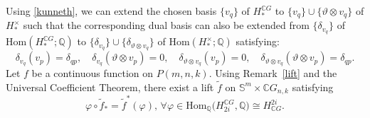\documentclass{amsart}
\newcommand{\remref}[1]{Remark~\ref{#1}}
\renewcommand{\hom}{\mathrm{Hom}}
\begin{document}
	
	Using \eqref{kunneth}, we can extend the chosen basis $\{v_q\}$ of $H_*^{\mathbb{C}G}$ to $	\{v_q\} \cup \{\vartheta \otimes v_q\}$ of $H_*^\times$ such that the corresponding dual basis can also be extended from $\{\delta_{v_q}\}$ of $ \hom (H_*^{\mathbb{C}G};\mathbb{Q})$ to $\{\delta_{v_q}\} \cup \{\delta_{\vartheta \otimes v_q}\} $ of %
$\hom (H_*^{\times};\mathbb{Q})$ satisfying:
	\begin{equation}\label{Kronecker relations}
		\delta_{v_q}( v_p) = \delta_{qp}, \quad
		\delta_{v_q}( \vartheta \otimes v_p)= 0, \quad
		\delta_{\vartheta\otimes v_q}(v_p) = 0, \quad
		\delta_{\vartheta\otimes v_q}(\vartheta \otimes v_p)= \delta_{qp}.
	\end{equation}
	Let $f$ %
be a continuous function on $P(m,n,k)$. Using \remref{lift} and the Universal Coefficient Theorem, there exist a lift $\tilde{f}$ on $\mathbb{S}^m\times \mathbb{C}G_{n,k}$ %
satisfying \begin{equation}\label{comm with phi}
		\varphi \circ \tilde{f}_* = \tilde{f}^*(\varphi) , \, \forall
		\varphi \in \hom _{\mathbb Q}\big(H_{2i}^{\mathbb CG}, \mathbb Q\big)\cong H^{2i}_{\mathbb CG}.
	\end{equation}
	
\end{document}
